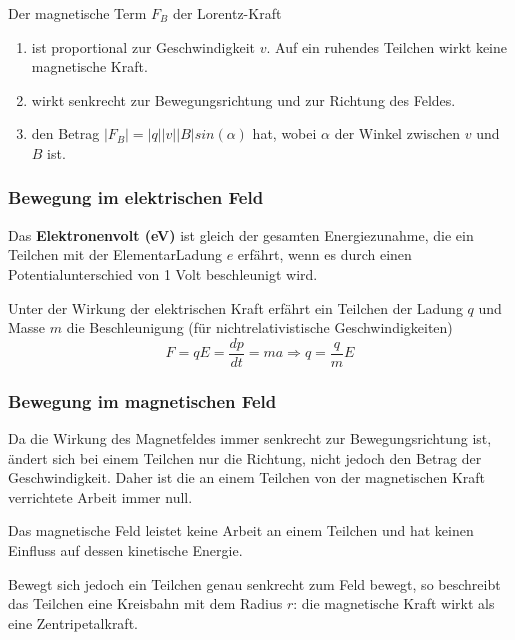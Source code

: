 \documentclass[11pt]{article}
\begin{document}
Der magnetische Term $F_B$ der Lorentz-Kraft
\begin{enumerate}
	\item ist proportional zur Geschwindigkeit $v$. Auf ein ruhendes Teilchen wirkt keine magnetische Kraft.
	\item wirkt senkrecht zur Bewegungsrichtung und zur Richtung des Feldes.
	\item den Betrag $|F_B| = |q||v||B|sin(\alpha)$ hat, wobei $\alpha$ der Winkel zwischen $v$ und $B$ ist.
\end{enumerate}

\subsubsection{Bewegung im elektrischen Feld}

Das \textbf{Elektronenvolt (eV)} ist gleich der gesamten Energiezunahme, die ein Teilchen mit der ElementarLadung $e$ erf{\"a}hrt, wenn es durch einen Potentialunterschied von 1 Volt beschleunigt wird. \newline

Unter der Wirkung der elektrischen Kraft erf{\"a}hrt ein Teilchen der Ladung $q$ und Masse $m$ die Beschleunigung (f{\"u}r nichtrelativistische Geschwindigkeiten)
\begin{equation*}
	F = qE = \frac{dp}{dt} = ma \Rightarrow q = \frac{q}{m}E
\end{equation*}

\subsubsection{Bewegung im magnetischen Feld}

Da die Wirkung des Magnetfeldes immer senkrecht zur Bewegungsrichtung ist, {\"a}ndert sich bei einem Teilchen nur die Richtung, nicht jedoch den Betrag der Geschwindigkeit. Daher ist die an einem Teilchen von der magnetischen Kraft verrichtete Arbeit immer null. \newline

Das magnetische Feld leistet keine Arbeit an einem Teilchen und hat keinen Einfluss auf dessen kinetische Energie. \newline

Bewegt sich jedoch ein Teilchen genau senkrecht zum Feld bewegt, so beschreibt das Teilchen eine Kreisbahn mit dem Radius $r$: die magnetische Kraft wirkt als eine Zentripetalkraft.
\end{document}
